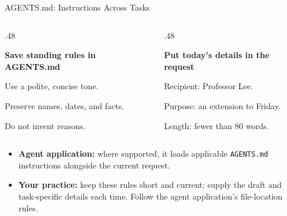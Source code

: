 \begin{frame}{AGENTS.md: Instructions Across Tasks}
\small
{}\par\smallskip
\begin{columns}[T,onlytextwidth]
\begin{column}{.48\textwidth}
\begin{conceptbox}\raggedright \textbf{Save standing rules in AGENTS.md}\par\medskip
Use a polite, concise tone.\par
Preserve names, dates, and facts.\par
Do not invent reasons.
\end{conceptbox}
\end{column}
\begin{column}{.48\textwidth}
\begin{conceptbox}\raggedright \textbf{Put today's details in the request}\par\medskip
Recipient: Professor Lee.\par
Purpose: an extension to Friday.\par
Length: fewer than 80 words.
\end{conceptbox}
\end{column}
\end{columns}
\par\medskip
\begin{itemize}
\item \textbf{Agent application:} where supported, it loads applicable \texttt{AGENTS.md} instructions alongside the current request.
\item \textbf{Your practice:} keep these rules short and current; supply the draft and task-specific details each time. Follow the agent application's file-location rules.
\end{itemize}
\end{frame}

